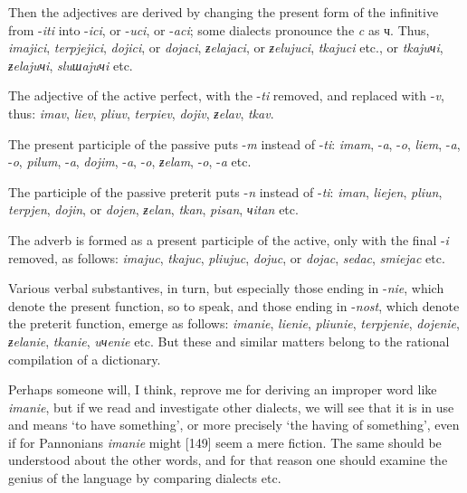 Then the adjectives are derived by changing the present form of the infinitive from -\textit{iti} into -\textit{ici}, or -\textit{uci}, or -\textit{aci}; some dialects pronounce the \textit{c} as ч. Thus, \textit{imajici}, \textit{terpjejici}, \textit{dojici}, or \textit{dojaci}, \textit{ƶelajaci}, or \textit{ƶelujuci}, \textit{tkajuci} etc., or \textit{tkajuчi}, \textit{ƶelajuчi}, \textit{sluшajuчi} etc.

The adjective of the active perfect, with the -\textit{ti} removed, and replaced with -\textit{v}, thus: \textit{imav}, \textit{liev}, \textit{pliuv}, \textit{terpiev}, \textit{dojiv}, \textit{ƶelav}, \textit{tkav}.

The present participle of the passive puts -\textit{m} instead of -\textit{ti}: \textit{imam}, -\textit{a}, -\textit{o}, \textit{liem}, -\textit{a}, -\textit{o}, \textit{pilum}, -\textit{a}, \textit{dojim}, -\textit{a}, -\textit{o}, \textit{ƶelam}, -\textit{o}, -\textit{a} etc.

The participle of the passive preterit puts -\textit{n} instead of -\textit{ti}: \textit{iman}, \textit{liejen}, \textit{pliun}, \textit{terpjen}, \textit{dojin}, or \textit{dojen}, \textit{ƶelan}, \textit{tkan}, \textit{pisan}, \textit{чitan} etc.

The adverb is formed as a present participle of the active, only with the final -\textit{i} removed, as follows: \textit{imajuc}, \textit{tkajuc}, \textit{pliujuc}, \textit{dojuc}, or \textit{dojac}, \textit{sedac}, \textit{smiejac} etc.

Various verbal substantives, in turn, but especially those ending in -\textit{nie}, which denote the present function, so to speak, and those ending in -\textit{nost}, which denote the preterit function, emerge as follows: \textit{imanie}, \textit{lienie}, \textit{pliunie}, \textit{terpjenie}, \textit{dojenie}, \textit{ƶelanie}, \textit{tkanie}, \textit{uчenie} etc. But these and similar matters belong to the rational compilation of a dictionary.

Perhaps someone will, I think, reprove me for deriving an improper word like \textit{imanie}, but if we read and investigate other dialects, we will see that it is in use and means ‘to have something’, or more precisely ‘the having of something’, even if for Pannonians \textit{imanie} might [149] seem a mere fiction. The same should be understood about the other words, and for that reason one should examine the genius of the language by comparing dialects etc.

